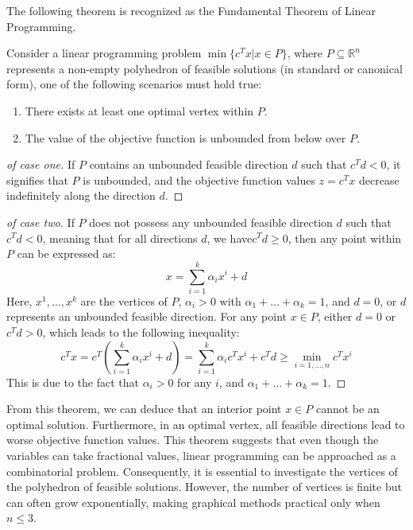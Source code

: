 \documentclass[12pt, a4paper]{report}
\begin{document}
    The following theorem is recognized as the Fundamental Theorem of Linear Programming.
    \begin{theorem}
        Consider a linear programming problem $\min\{c^Tx|x \in P\}$, where $P \subseteq \mathbb{R}^n$ represents a non-empty polyhedron of feasible solutions (in standard or canonical form), one of the following scenarios must hold true:
        \begin{enumerate}
            \item There exists at least one optimal vertex within $P$.
            \item The value of the objective function is unbounded from below over $P$.
        \end{enumerate}
    \end{theorem}
    \begin{proof}[of case one]
        If $P$ contains an unbounded feasible direction $d$ such that $c^Td < 0$, it signifies that $P$ is unbounded, and the objective function values $z=c^Tx$ decrease indefinitely along the direction $d$. 
    \end{proof}
    \begin{proof}[of case two]
        If $P$ does not possess any unbounded feasible direction $d$ such that $c^Td < 0$, meaning that for all directions $d$, we have$c^Td \geq 0$, then any point within $P$ can be expressed as: 
        \[x=\sum_{i=1}^k{\alpha_ix^i + d}\]
        Here, $x^1,\dots,x^k$ are the vertices of $P$, $\alpha_i > 0$ with $\alpha_1+\dots+\alpha_k=1$, and $d = 0$, or $d$ represents an unbounded feasible direction.
        For any point $x \in P$, either $d = 0$ or $c^Td > 0$, which leads to the following inequality:
        \[c^Tx=c^T\left(\sum_{i=1}^{k}{\alpha_ix^i+d}\right)=\sum_{i=1}^{k}{\alpha_ic^Tx^i+c^Td}\geq\min_{i=1,\dots,n}{c^Tx^i}\]
        This is due to the fact that $\alpha_i > 0$ for any $i$, and $\alpha_1+\dots+\alpha_k=1$. 
    \end{proof}
    From this theorem, we can deduce that an interior point $x \in P$ cannot be an optimal solution. 
    Furthermore, in an optimal vertex, all feasible directions lead to worse objective function values.
    This theorem suggests that even though the variables can take fractional values, linear programming can be approached as a combinatorial problem.
    Consequently, it is essential to investigate the vertices of the polyhedron of feasible solutions.
    However, the number of vertices is finite but can often grow exponentially, making graphical methods practical only when $n \leq 3$. 
\end{document}
